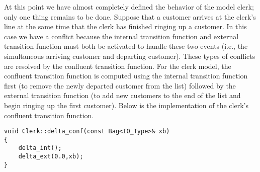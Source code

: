 At this point we have almost completely defined the behavior of the
model clerk; only one thing remains to be done. Suppose that a
customer arrives at the clerk's line at the same time that the clerk
has finished ringing up a customer. In this case we have a conflict
because the internal transition function and external transition
function must both be activated to handle these two events (i.e., the simultaneous arriving customer and departing customer).
These types of conflicts are resolved by the confluent transition
function. For the clerk model, the confluent transition function is
computed using the internal transition function first (to remove
the newly departed customer from the list) followed by the external
transition function (to add new customers to the end of the list and
begin ringing up the first customer). Below is the implementation of
the clerk's confluent transition function.
\begin{verbatim}
void Clerk::delta_conf(const Bag<IO_Type>& xb)
{
    delta_int();
    delta_ext(0.0,xb);
}
\end{verbatim}

